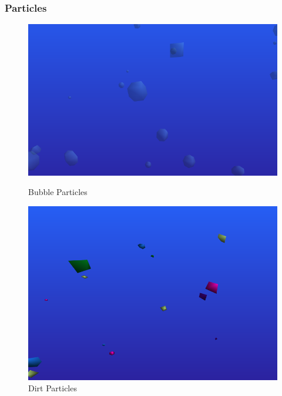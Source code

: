 \documentclass[a4paper,10pt]{article}
\begin{document}
\subsubsection{Particles}

\begin{figure}[H]
    \centering
    \begin{minipage}{0.45\textwidth}
        \centering
        \includegraphics[width=1\textwidth]{Screenshot_20190226_200209.png} %
        \caption{Bubble Particles}
    \end{minipage}\hfill
    \begin{minipage}{0.45\textwidth}
        \centering
        \includegraphics[width=1\textwidth]{Screenshot_20190226_200304.png} %
        \caption{Dirt Particles}
    \end{minipage}
\end{figure}
\end{document}
